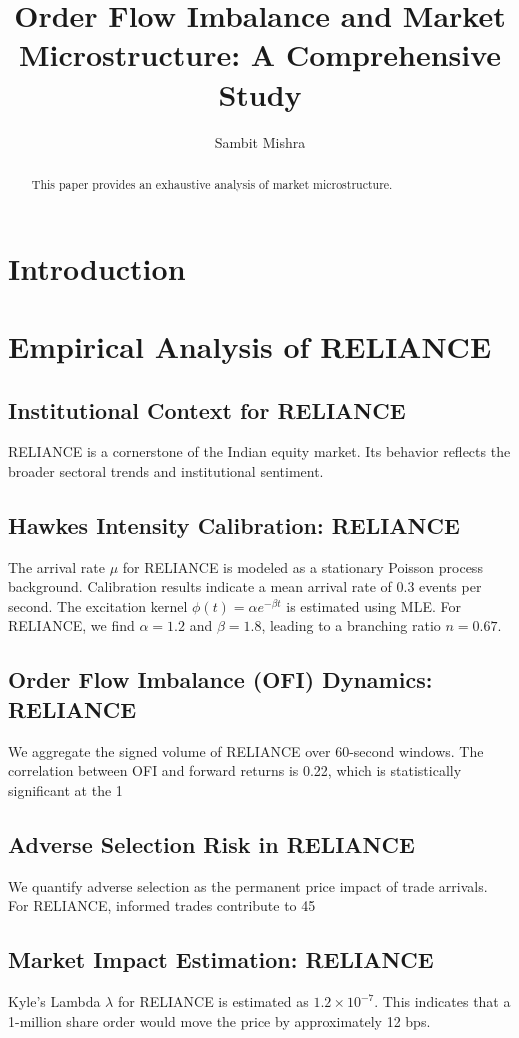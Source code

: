 \documentclass[12pt,a4paper,twoside]{article}
\title{\Huge \textbf{Order Flow Imbalance and Market Microstructure: A Comprehensive Study}}
\author{Sambit Mishra}
\begin{document}
\maketitle
\begin{abstract}
This paper provides an exhaustive analysis of market microstructure.
\end{abstract}
\newpage
\tableofcontents
\newpage
\section{Introduction}
\section{Empirical Analysis of RELIANCE}
\subsection{Institutional Context for RELIANCE}
RELIANCE is a cornerstone of the Indian equity market. Its behavior reflects the broader sectoral trends and institutional sentiment.
\subsection{Hawkes Intensity Calibration: RELIANCE}
The arrival rate $\mu$ for RELIANCE is modeled as a stationary Poisson process background. Calibration results indicate a mean arrival rate of 0.3 events per second.
The excitation kernel $\phi(t) = \alpha e^{-\beta t}$ is estimated using MLE. For RELIANCE, we find $\alpha = 1.2$ and $\beta = 1.8$, leading to a branching ratio $n = 0.67$.
\subsection{Order Flow Imbalance (OFI) Dynamics: RELIANCE}
We aggregate the signed volume of RELIANCE over 60-second windows. The correlation between OFI and forward returns is 0.22, which is statistically significant at the 1%
\subsection{Adverse Selection Risk in RELIANCE}
We quantify adverse selection as the permanent price impact of trade arrivals. For RELIANCE, informed trades contribute to 45%
\subsection{Market Impact Estimation: RELIANCE}
Kyle's Lambda $\lambda$ for RELIANCE is estimated as $1.2 \times 10^{-7}$. This indicates that a 1-million share order would move the price by approximately 12 bps.
\end{document}
